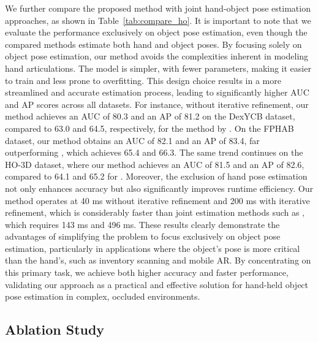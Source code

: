 We further compare the proposed method with joint hand-object pose estimation approaches, as shown in Table~\ref{tab:compare_ho}. It is important to note that we evaluate the performance exclusively on object pose estimation, even though the compared methods estimate both hand and object poses. By focusing solely on object pose estimation, our method avoids the complexities inherent in modeling hand articulations. The model is simpler, with fewer parameters, making it easier to train and less prone to overfitting. This design choice results in a more streamlined and accurate estimation process, leading to significantly higher AUC and AP scores across all datasets. For instance, without iterative refinement, our method achieves an AUC of 80.3 and an AP of 81.2 on the DexYCB dataset, compared to 63.0 and 64.5, respectively, for the method by \cite{qi2024hoisdf}. On the FPHAB dataset, our method obtains an AUC of 82.1 and an AP of 83.4, far outperforming \cite{qi2024hoisdf}, which achieves 65.4 and 66.3. The same trend continues on the HO-3D dataset, where our method achieves an AUC of 81.5 and an AP of 82.6, compared to 64.1 and 65.2 for \cite{qi2024hoisdf}. Moreover, the exclusion of hand pose estimation not only enhances accuracy but also significantly improves runtime efficiency. Our method operates at 40 ms without iterative refinement and 200 ms with iterative refinement, which is considerably faster than joint estimation methods such as \cite{lin2023harmonious}, which requires 143 ms and 496 ms. These results clearly demonstrate the advantages of simplifying the problem to focus exclusively on object pose estimation, particularly in applications where the object's pose is more critical than the hand's, such as inventory scanning and mobile AR. By concentrating on this primary task, we achieve both higher accuracy and faster performance, validating our approach as a practical and effective solution for hand-held object pose estimation in complex, occluded environments.


\subsection{Ablation Study}

